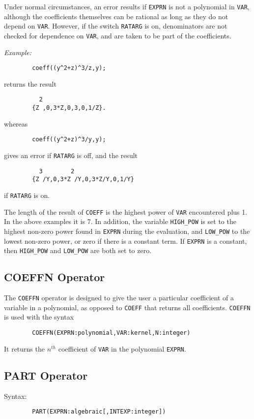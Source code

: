Under normal circumstances, an error results if {\tt EXPRN} is not a
polynomial in {\tt VAR}, although the coefficients themselves can be
rational as long as they do not depend on {\tt VAR}.  However, if the
switch {\tt RATARG} is on, denominators are not checked for
dependence on {\tt VAR}, and are taken to be part of the coefficients.

{\it Example:}
\begin{verbatim}
        coeff((y^2+z)^3/z,y);
\end{verbatim}
returns the result
\begin{verbatim}
          2
        {Z ,0,3*Z,0,3,0,1/Z}.
\end{verbatim}
whereas
\begin{verbatim}
        coeff((y^2+z)^3/y,y);
\end{verbatim}
gives an error if {\tt RATARG} is off, and the result
\begin{verbatim}
          3        2
        {Z /Y,0,3*Z /Y,0,3*Z/Y,0,1/Y}
\end{verbatim}
if {\tt RATARG} is on.

\hypertarget{reserved:HIGH_POW}{}
\hypertarget{reserved:LOW_POW}{}
The length of the result of {\tt COEFF} is the highest power of {\tt VAR}
encountered plus 1.  In the above examples it is 7.  In addition, the
variable {\tt HIGH\_POW} is set to the highest non-zero
power found in {\tt EXPRN} during the evaluation, and {\tt LOW\_POW}
 to the lowest non-zero power, or zero if there is a
constant term.  If {\tt EXPRN} is a constant, then {\tt HIGH\_POW} and
{\tt LOW\_POW} are both set to zero.

\subsection{COEFFN Operator}
\hypertarget{operator:COEFFN}{}

The {\tt COEFFN} operator is designed to give the user a particular
coefficient of a variable in a polynomial, as opposed to {\tt COEFF} that
returns all coefficients. {\tt COEFFN} is used with the syntax
\begin{verbatim}
        COEFFN(EXPRN:polynomial,VAR:kernel,N:integer)
\end{verbatim}
It returns the $n^{th}$ coefficient of {\tt VAR} in the polynomial
{\tt EXPRN}.

\subsection{PART Operator}
\hypertarget{operator:PART}{}
Syntax:
\begin{verbatim}
        PART(EXPRN:algebraic[,INTEXP:integer])
\end{verbatim}

